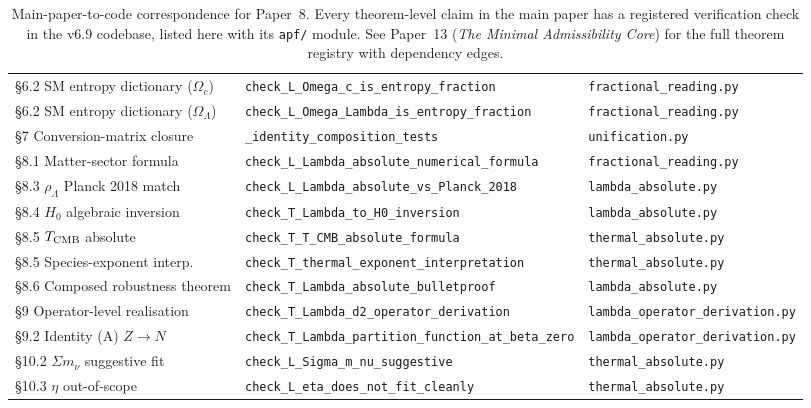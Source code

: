\documentclass[11pt]{article}
\theoremstyle{plain}
\theoremstyle{definition}
\theoremstyle{remark}
\newcommand{\paperref}[2]{Paper~#1 (\emph{#2})}
\begin{document}
\begin{table}[h]
\begin{tabularx}{\textwidth}{@{}l X l@{}}
\S6.2 SM entropy dictionary ($\Omega_c$)  & \texttt{check\_L\_Omega\_c\_is\_entropy\_fraction}      & \texttt{fractional\_reading.py} \\
\S6.2 SM entropy dictionary ($\Omega_\Lambda$) & \texttt{check\_L\_Omega\_Lambda\_is\_entropy\_fraction} & \texttt{fractional\_reading.py} \\
\addlinespace[2pt]
\S7 Conversion-matrix closure            & \texttt{\_identity\_composition\_tests}                 & \texttt{unification.py} \\
\addlinespace[2pt]
\S8.1 Matter-sector formula              & \texttt{check\_L\_Lambda\_absolute\_numerical\_formula} & \texttt{fractional\_reading.py} \\
\S8.3 $\rho_\Lambda$ Planck 2018 match   & \texttt{check\_L\_Lambda\_absolute\_vs\_Planck\_2018}   & \texttt{lambda\_absolute.py} \\
\S8.4 $H_0$ algebraic inversion          & \texttt{check\_T\_Lambda\_to\_H0\_inversion}            & \texttt{lambda\_absolute.py} \\
\S8.5 $T_{\rm CMB}$ absolute              & \texttt{check\_T\_T\_CMB\_absolute\_formula}            & \texttt{thermal\_absolute.py} \\
\S8.5 Species-exponent interp.           & \texttt{check\_T\_thermal\_exponent\_interpretation}    & \texttt{thermal\_absolute.py} \\
\S8.6 Composed robustness theorem        & \texttt{check\_T\_Lambda\_absolute\_bulletproof}        & \texttt{lambda\_absolute.py} \\
\addlinespace[2pt]
\S9 Operator-level realisation           & \texttt{check\_T\_Lambda\_d2\_operator\_derivation}     & \texttt{lambda\_operator\_derivation.py} \\
\S9.2 Identity (A) $Z \to N$             & \texttt{check\_T\_Lambda\_partition\_function\_at\_beta\_zero} & \texttt{lambda\_operator\_derivation.py} \\
\addlinespace[2pt]
\S10.2 $\Sigma m_\nu$ suggestive fit     & \texttt{check\_L\_Sigma\_m\_nu\_suggestive}             & \texttt{thermal\_absolute.py} \\
\S10.3 $\eta$ out-of-scope               & \texttt{check\_L\_eta\_does\_not\_fit\_cleanly}         & \texttt{thermal\_absolute.py} \\
\bottomrule
\end{tabularx}
\caption{Main-paper-to-code correspondence for Paper~8.  Every theorem-level claim in the main paper has a registered verification check in the v6.9 codebase, listed here with its \texttt{apf/} module.  See \paperref{13}{The Minimal Admissibility Core} for the full theorem registry with dependency edges.}\label{tab:code_map}
\end{table}
\end{document}
